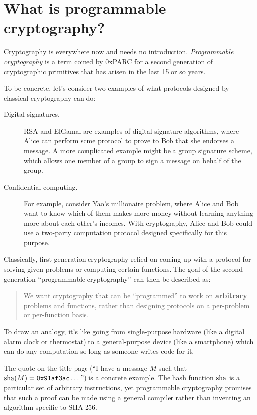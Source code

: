 \section{What is programmable cryptography?}
Cryptography is everywhere now and needs no introduction.
\emph{Programmable cryptography} is a term coined by 0xPARC for a second
generation of cryptographic primitives that has arisen in the last 15 or
so years.

To be concrete, let's consider two examples of what protocols designed
by classical cryptography can do:

\begin{description}
\item[Digital signatures.] RSA and ElGamal are examples of digital
  signature algorithms, where Alice can perform some protocol to prove
  to Bob that she endorses a message. A more complicated example might
  be a group signature scheme,
  which allows one member of a group to sign a message on behalf of the
  group.

\item[Confidential computing.] For example, consider
  Yao's millionaire problem,
  where Alice and Bob want to know which of them makes more money
  without learning anything more about each other's incomes. With
  cryptography, Alice and Bob could use a two-party computation protocol
  designed specifically for this purpose.
\end{description}

Classically, first-generation cryptography relied on coming up with a
protocol for solving given problems or computing certain functions. The
goal of the second-generation ``programmable cryptography'' can then be
described as:

\begin{quote}
We want cryptography that can be ``programmed'' to work on
\textbf{arbitrary} problems and functions, rather than designing
protocols on a per-problem or per-function basis.
\end{quote}

To draw an analogy, it's like going from single-purpose hardware (like
a digital alarm clock or thermostat) to a general-purpose device (like a
smartphone) which can do any computation so long as someone writes code
for it.

\begin{remark}{}{}
The quote on the title page
(``I have a message $M$ such that $\operatorname{sha}(M) = \mathtt{0x91af3ac}\dots$'')
is a concrete example.
The hash function $\operatorname{sha}$ is a particular set of arbitrary instructions,
yet programmable cryptography promises that such a proof can be made
using a general compiler rather than inventing an algorithm specific to SHA-256.
\end{remark}

